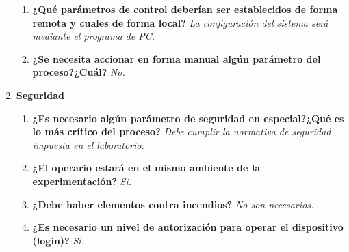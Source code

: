 \documentclass[12pt]{article}
\begin{document}
\begin{enumerate}
\begin{enumerate}
	  \item \textbf{ ¿Qué parámetros de control deberían ser establecidos de forma remota y cuales de forma local? }
		\subitem	\textit{ La configuración del sistema será mediante el programa de PC.
				}

	  \item \textbf{ ¿Se necesita accionar en forma manual algún parámetro del proceso?¿Cuál? }
		\subitem	\textit{ No.
				}

	\end{enumerate}
      
      \item \textbf{ Seguridad }
	\begin{enumerate}
	  \item \textbf{ ¿Es necesario algún parámetro de seguridad en especial?¿Qué es lo más crítico del proceso? }
		\subitem	\textit{ Debe cumplir la normativa de seguridad impuesta en el laboratorio.
				}

	  \item \textbf{ ¿El operario estará en el mismo ambiente de la experimentación? }
		\subitem	\textit{ Si.
				}

	  \item \textbf{ ¿Debe haber elementos contra incendios? }
		\subitem	\textit{ No son necesarios.
				}

	  \item \textbf{ ¿Es necesario un nivel de autorización para operar el dispositivo (login)? }
		\subitem	\textit{ Si.
				}

	\end{enumerate}
      
    \end{enumerate}
\end{document}
